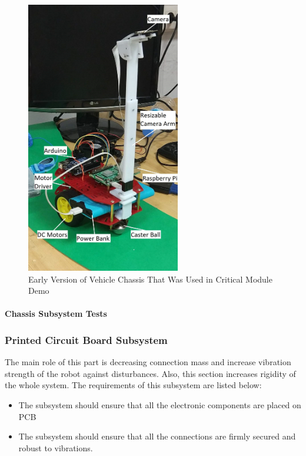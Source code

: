 \documentclass[a4paper,12pt]{article}
\begin{document}
	
	\begin{figure}[H]
		\center
		\setlength{\unitlength}{\textwidth} 								 
		\includegraphics[width=0.6\textwidth]{images/chassis3}
		\caption{\label{fig:chassis}Early Version of Vehicle Chassis That Was Used in Critical Module Demo}
	\end{figure}
	
	\paragraph{Chassis Subsystem Tests}
	
	
	
	\subsubsection{Printed Circuit Board Subsystem}
	The main role of this part is decreasing connection mass and increase vibration strength of the robot against disturbances. Also, this section increases rigidity of the whole system. The requirements of this subsystem are listed below:
	\begin{itemize}
		\item The subsystem should ensure that all the electronic components are placed on PCB
		\item The subsystem should ensure that all the connections are firmly secured and robust to vibrations.
	\end{itemize}
	
\end{document}
